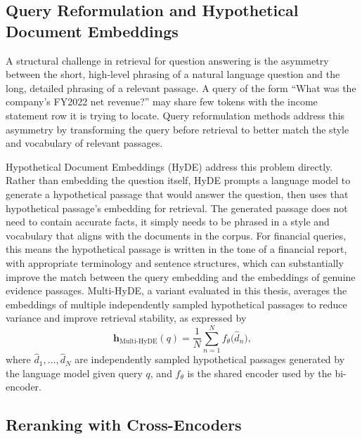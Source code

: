 \documentclass[12pt,twoside,maitrise]{dms}
\theoremstyle{definition}
\numberwithin{equation}{section}
\numberwithin{table}{chapter}
\numberwithin{figure}{chapter}
\begin{document}
\subsection{Query Reformulation and Hypothetical Document Embeddings}

A structural challenge in retrieval for question answering is the asymmetry between the
short, high-level phrasing of a natural language question and the long, detailed phrasing
of a relevant passage. A query of the form ``What was the company's FY2022 net revenue?''
may share few tokens with the income statement row it is trying to locate. Query
reformulation methods address this asymmetry by transforming the query before retrieval
to better match the style and vocabulary of relevant passages.

Hypothetical Document Embeddings (HyDE) \citep{gao2023precise} address this problem
directly. Rather than embedding the question itself, HyDE prompts a language model to
generate a hypothetical passage that would answer the question, then uses that
hypothetical passage's embedding for retrieval. The generated passage does not need to
contain accurate facts, it simply needs to be phrased in a style and vocabulary that aligns with the
documents in the corpus. For financial queries, this means the hypothetical passage is
written in the tone of a financial report, with appropriate terminology and sentence
structures, which can substantially improve the match between the query embedding and
the embeddings of genuine evidence passages. Multi-HyDE, a variant evaluated in this
thesis, averages the embeddings of multiple independently sampled hypothetical passages
to reduce variance and improve retrieval stability, as expressed by
\begin{equation}
  \mathbf{h}_{\text{Multi-HyDE}}(q) = \frac{1}{N}\sum_{n=1}^{N} f_\theta\!\bigl(\hat{d}_n\bigr),
\end{equation}
where $\hat{d}_1, \ldots, \hat{d}_N$ are independently sampled hypothetical passages
generated by the language model given query $q$, and $f_\theta$ is the shared encoder
used by the bi-encoder.

\subsection{Reranking with Cross-Encoders}
\end{document}
